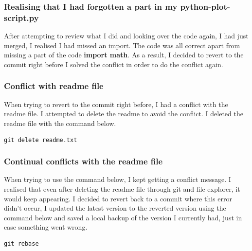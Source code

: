 \documentclass[]{article}
\begin{document}
\subsubsection{Realising that I had forgotten a part in my python-plot-script.py}
After attempting to review what I did and looking over the code again, I had just merged, I realised I had missed an import. The code was all correct
apart from missing a part of the code \textbf{import math}. As a result, I decided to revert to the commit right before I solved the conflict in order to do the conflict again.

\subsubsection{Conflict with readme file}
When trying to revert to the commit right before, I had a conflict with the readme file.
I attempted to delete the readme to avoid the conflict. I deleted the readme file with the command below.
\begin{tcolorbox}[colback=white, colframe=black, boxrule=1pt, 
    fonttitle=\bfseries, listing only, listing options={language=sh, basicstyle=\ttfamily}]
\begin{verbatim}
git delete readme.txt
\end{verbatim}
\end{tcolorbox}

\subsubsection{Continual conflicts with the readme file}
When trying to use the command below, I kept getting a conflict message. I realised that even after deleting the readme file through git
and file explorer, it would keep appearing. I decided to revert back to a commit where this error didn't occur, I updated the latest version to the reverted version
using the command below and saved a local
backup of the version I currently had, just in case something went wrong. 
\begin{tcolorbox}[colback=white, colframe=black, boxrule=1pt, 
    fonttitle=\bfseries, listing only, listing options={language=sh, basicstyle=\ttfamily}]
\begin{verbatim}
git rebase
\end{verbatim}
\end{tcolorbox}
\end{document}
